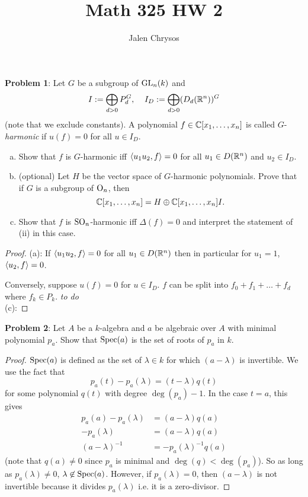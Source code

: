 \documentclass{amsart}
\title{Math 325 HW 2}
\author{Jalen Chrysos}
\begin{document}
	
\noindent\textbf{Problem 1}: Let $G$ be a subgroup of $\operatorname{GL}_n(k)$ and 
	$$
	I := \bigoplus_{d>0} P_d^G, \;\;\;\; I_D := \bigoplus_{d>0} (D_d(\mathbb{R}^n))^G
	$$
	(note that we exclude constants). A polynomial $f\in \mathbb{C}[x_1,\dots,x_n]$ is called $G$-\textit{harmonic} if $u(f)=0$ for all $u\in I_D$.
	\begin{enumerate}[(a)]
		\item Show that $f$ is $G$-harmonic iff $\langle u_1u_2,f\rangle=0$ for all $u_1\in D(\mathbb{R}^n)$ and $u_2\in I_D$.
		\item (optional) Let $H$ be the vector space of $G$-harmonic polynomials. Prove that if $G$ is a subgroup of $\mathrm{O}_n$, then 
		$$
		\mathbb{C}[x_1,\dots,x_n] = H\oplus \mathbb{C}[x_1,\dots,x_n]I.
		$$
		\item Show that $f$ is $\operatorname{SO}_n$-harmonic iff $\Delta(f)=0$ and interpret the statement of (ii) in this case.
	\end{enumerate}
	
	\begin{proof}
		(a): If $\langle u_1u_2,f\rangle=0$ for all $u_1\in D(\mathbb{R}^n)$ then in particular for $u_1=1$, $\langle u_2,f\rangle=0$.
		
		Conversely, suppose $u(f)=0$ for $u\in I_D$. $f$ can be split into $f_0+f_1+\dots+f_d$ where $f_k\in P_k$. \textit{to do}\\
		
		(c):  
	\end{proof}
	
\newpage 

\noindent\textbf{Problem 2}: Let $A$ be a $k$-algebra and $a$ be algebraic over $A$ with minimal polynomial $p_a$. Show that $\operatorname{Spec}(a)$ is the set of roots of $p_a$ in $k$. 

\begin{proof}
	$\operatorname{Spec}(a)$ is defined as the set of $\lambda \in k$ for which $(a-\lambda)$ is invertible. We use the fact that 
	$$
	p_a(t) - p_a(\lambda) = (t-\lambda)q(t)
	$$
	for some polynomial $q(t)$ with degree $\deg(p_a)-1$. In the case $t=a$, this gives
	\begin{align*}
	p_a(a) - p_a(\lambda) &= (a-\lambda)q(a) \\
	 -p_a(\lambda) &= (a-\lambda)q(a)\\
	 (a-\lambda)^{-1} &= -p_a(\lambda)^{-1}q(a)
	\end{align*}
	(note that $q(a)\neq 0$ since $p_a$ is minimal and $\deg(q)<\deg(p_a)$). So as long as $p_a(\lambda)\neq 0$, $\lambda \not\in \operatorname{Spec}(a)$. However, if $p_a(\lambda)=0$, then $(a-\lambda)$ is not invertible because it divides $p_a(\lambda)$ i.e. it is a zero-divisor.
\end{proof}
\end{document}
